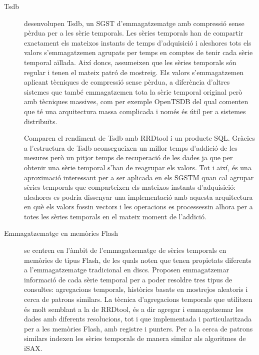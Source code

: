 \begin{description}
\item[Tsdb] \textcite{deri12:tsdb_compressed_database} desenvolupen
  Tsdb, un \gls{SGST} d'emmagatzematge amb compressió sense pèrdua per
  a les sèrie temporals. Les sèries temporals han de compartir
  exactament els mateixos instants de temps d'adquisició i aleshores
  tots els valors s'emmagatzemen agrupats per temps en comptes de
  tenir cada sèrie temporal aïllada.  Així doncs, assumeixen que les
  sèries temporals són regular i tenen el mateix patró de
  mostreig. Els valors s'emmagatzemen aplicant tècniques de compressió
  sense pèrdua, a diferència d'altres sistemes que també emmagatzemen
  tota la sèrie temporal original però amb tècniques massives, com per
  exemple OpenTSDB del qual comenten que té una arquitectura massa
  complicada i només és útil per a sistemes distribuïts.

  Comparen el rendiment de Tsdb amb RRDtool i un producte
  \gls{SQL}. Gràcies a l'estructura de Tsdb aconsegueixen un millor
  temps d'addició de les mesures però un pitjor temps de recuperació
  de les dades ja que per obtenir una sèrie temporal s'han de
  reagrupar els valors. Tot i així, és una aproximació interessant per
  a ser aplicada en els \gls{SGSTM} quan cal agrupar sèries temporals
  que comparteixen els mateixos instants d'adquisició: aleshores es
  podria dissenyar una implementació amb aquesta arquitectura en què
  els valors fossin vectors i les operacions es processessin alhora
  per a totes les sèries temporals en el mateix moment de l'addició.





\item[Emmagatzematge en memòries Flash]
  \textcite{dou14:historic_queries_flash_storage} se centren en
  l'àmbit de l'emmagatzematge de sèries temporals en memòries de tipus
  Flash, de les quals noten que tenen propietats diferents a
  l'emmagatzematge tradicional en discs.  Proposen emmagatzemar
  informació de cada sèrie temporal per a poder resoldre tres tipus de
  consultes: agregacions temporals, històrics basats en mostrejos
  aleatoris i cerca de patrons similars.  La tècnica d'agregacions
  temporals que utilitzen és molt semblant a la de RRDtool, és a dir
  agregar i emmagatzemar les dades amb diferents resolucions, tot i
  que implementada i particularitzada per a les memòries Flash, amb
  registre i punters. Per a la cerca de patrons similars indexen les
  sèries temporals de manera similar als algoritmes de iSAX.


\end{description}



